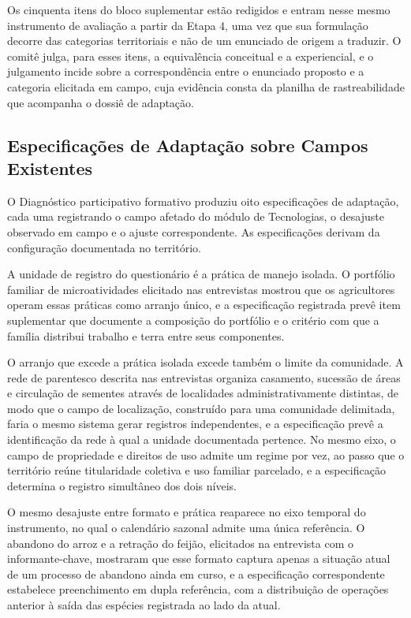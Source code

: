 \documentclass[preprint,authoryear,12pt]{elsarticle}
\begin{document}
Os cinquenta itens do bloco suplementar estão redigidos e entram nesse mesmo instrumento de avaliação a partir da Etapa 4, uma vez que sua formulação decorre das categorias territoriais e não de um enunciado de origem a traduzir. O comitê julga, para esses itens, a equivalência conceitual e a experiencial, e o julgamento incide sobre a correspondência entre o enunciado proposto e a categoria elicitada em campo, cuja evidência consta da planilha de rastreabilidade que acompanha o dossiê de adaptação.

\subsection{Especificações de Adaptação sobre Campos Existentes}

O Diagnóstico participativo formativo produziu oito especificações de adaptação, cada uma registrando o campo afetado do módulo de Tecnologias, o desajuste observado em campo e o ajuste correspondente. As especificações derivam da configuração documentada no território.

A unidade de registro do questionário é a prática de manejo isolada. O portfólio familiar de microatividades elicitado nas entrevistas mostrou que os agricultores operam essas práticas como arranjo único, e a especificação registrada prevê item suplementar que documente a composição do portfólio e o critério com que a família distribui trabalho e terra entre seus componentes.

O arranjo que excede a prática isolada excede também o limite da comunidade. A rede de parentesco descrita nas entrevistas organiza casamento, sucessão de áreas e circulação de sementes através de localidades administrativamente distintas, de modo que o campo de localização, construído para uma comunidade delimitada, faria o mesmo sistema gerar registros independentes, e a especificação prevê a identificação da rede à qual a unidade documentada pertence. No mesmo eixo, o campo de propriedade e direitos de uso admite um regime por vez, ao passo que o território reúne titularidade coletiva e uso familiar parcelado, e a especificação determina o registro simultâneo dos dois níveis.

O mesmo desajuste entre formato e prática reaparece no eixo temporal do instrumento, no qual o calendário sazonal admite uma única referência. O abandono do arroz e a retração do feijão, elicitados na entrevista com o informante-chave, mostraram que esse formato captura apenas a situação atual de um processo de abandono ainda em curso, e a especificação correspondente estabelece preenchimento em dupla referência, com a distribuição de operações anterior à saída das espécies registrada ao lado da atual.
\end{document}
